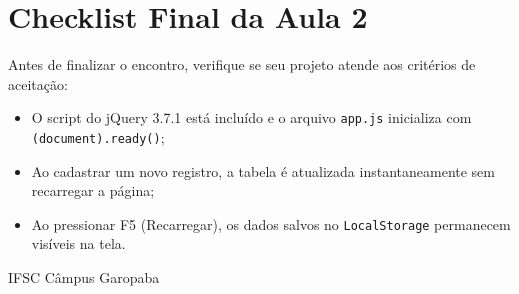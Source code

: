 
\section{Checklist Final da Aula 2}\label{sec:m4b}

\begin{checklist}

Antes de finalizar o encontro, verifique se seu projeto atende aos critérios de aceitação:

\begin{itemize}
\item[\caixaMarcar] O script do jQuery 3.7.1 está incluído e o arquivo \texttt{app.js} inicializa com \texttt{\textdollar(document).ready()};
\item[\caixaMarcar] Ao cadastrar um novo registro, a tabela é atualizada instantaneamente sem recarregar a página;
\item[\caixaMarcar] Ao pressionar F5 (Recarregar), os dados salvos no \texttt{LocalStorage} permanecem visíveis na tela.
\end{itemize}
\end{checklist}

\vfill
{\centering\footnotesize\color{suave}\faMapMarkerAlt\hspace{0.4em}IFSC Câmpus Garopaba\par}
